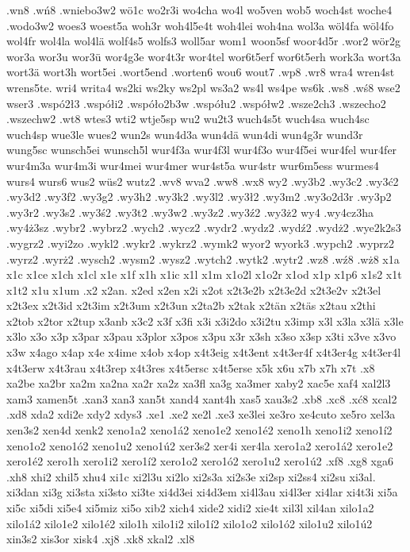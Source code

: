 {{.wn8
.wń8
.wniebo3w2
wö1c
wo2r3i
wo4cha
wo4l
wo5ven
wob5
woch4st
woche4
.wodo3w2
woes3
woest5a
woh3r
woh4l5e4t
woh4lei
woh4na
wol3a
wöl4fa
wöl4fo
wol4fr
wol4la
wol4lä
wolf4s5
wolfs3
woll5ar
wom1
woon5sf
woor4d5r
.wor2
wör2g
wor3a
wor3u
wor3ü
wor4g3e
wor4t3r
wor4tel
wor6t5erf
wor6t5erh
work3a
wort3a
wort3ä
wort3h
wort5ei
.wort5end
.worten6
wou6
wout7
.wp8
.wr8
wra4
wren4st
wrens5te.
wri4
writa4
ws2ki
ws2ky
ws2pl
ws3a2
ws4l
ws4pe
ws6k
.ws8
.wś8
wse2
wser3
.wspó2ł3
.współi2
.współo2b3w
.współu2
.współw2
.wsze2ch3
.wszecho2
.wszechw2
.wt8
wtes3
wti2
wtje5sp
wu2
wu2t3
wuch4s5t
wuch4sa
wuch4sc
wuch4sp
wue3le
wues2
wun2s
wun4d3a
wun4dä
wun4di
wun4g3r
wund3r
wung5sc
wunsch5ei
wunsch5l
wur4f3a
wur4f3l
wur4f3o
wur4f5ei
wur4fel
wur4fer
wur4m3a
wur4m3i
wur4mei
wur4mer
wur4st5a
wur4str
wur6m5ess
wurmes4
wurs4
wurs6
wus2
wüs2
wutz2
.wv8
wva2
.ww8
.wx8
wy2
.wy3b2
.wy3c2
.wy3ć2
.wy3d2
.wy3f2
.wy3g2
.wy3h2
.wy3k2
.wy3l2
.wy3ł2
.wy3m2
.wy3o2d3r
.wy3p2
.wy3r2
.wy3s2
.wy3ś2
.wy3t2
.wy3w2
.wy3z2
.wy3ź2
.wy3ż2
wy4
.wy4cz3ha
.wy4ż3sz
.wybr2
.wybrz2
.wych2
.wycz2
.wydr2
.wydz2
.wydź2
.wydż2
.wye2k2s3
.wygrz2
.wyi2zo
.wykl2
.wykr2
.wykrz2
.wymk2
wyor2
wyork3
.wypch2
.wyprz2
.wyrz2
.wyrż2
.wysch2
.wysm2
.wysz2
.wytch2
.wytk2
.wytr2
.wz8
.wź8
.wż8
x1a
x1c
x1ce
x1ch
x1cl
x1e
x1f
x1h
x1ic
x1l
x1m
x1o2l
x1o2r
x1od
x1p
x1p6
x1s2
x1t
x1t2
x1u
x1um
.x2
x2an.
x2ed
x2en
x2i
x2ot
x2t3e2b
x2t3e2d
x2t3e2v
x2t3el
x2t3ex
x2t3id
x2t3im
x2t3um
x2t3un
x2ta2b
x2tak
x2tän
x2täs
x2tau
x2thi
x2tob
x2tor
x2tup
x3anb
x3c2
x3f
x3fi
x3i
x3i2do
x3i2tu
x3imp
x3l
x3la
x3lä
x3le
x3lo
x3o
x3p
x3par
x3pau
x3plor
x3pos
x3pu
x3r
x3sh
x3so
x3sp
x3ti
x3ve
x3vo
x3w
x4ago
x4ap
x4e
x4ime
x4ob
x4op
x4t3eig
x4t3ent
x4t3er4f
x4t3er4g
x4t3er4l
x4t3erw
x4t3rau
x4t3rep
x4t3res
x4t5ersc
x4t5erse
x5k
x6u
x7b
x7h
x7t
.x8
xa2be
xa2br
xa2m
xa2na
xa2r
xa2z
xa3fl
xa3g
xa3mer
xaby2
xac5e
xaf4
xal2l3
xam3
xamen5t
.xan3
xan3
xan5t
xand4
xant4h
xas5
xau3s2
.xb8
.xc8
.xć8
xcal2
.xd8
xda2
xdi2e
xdy2
xdys3
.xe1
.xe2
xe2l
.xe3
xe3lei
xe3ro
xe4cuto
xe5ro
xel3a
xen3s2
xen4d
xenk2
xeno1a2
xeno1á2
xeno1e2
xeno1é2
xeno1h
xeno1i2
xeno1í2
xeno1o2
xeno1ó2
xeno1u2
xeno1ú2
xer3s2
xer4i
xer4la
xero1a2
xero1á2
xero1e2
xero1é2
xero1h
xero1i2
xero1í2
xero1o2
xero1ó2
xero1u2
xero1ú2
.xf8
.xg8
xga6
.xh8
xhi2
xhil5
xhu4
xi1c
xi2l3u
xi2lo
xi2s3a
xi2s3e
xi2sp
xi2ss4
xi2su
xi3al.
xi3dan
xi3g
xi3sta
xi3sto
xi3te
xi4d3ei
xi4d3em
xi4l3au
xi4l3er
xi4lar
xi4t3i
xi5a
xi5c
xi5di
xi5e4
xi5miz
xi5o
xib2
xich4
xide2
xidi2
xie4t
xil3l
xil4an
xilo1a2
xilo1á2
xilo1e2
xilo1é2
xilo1h
xilo1i2
xilo1í2
xilo1o2
xilo1ó2
xilo1u2
xilo1ú2
xin3s2
xis3or
xisk4
.xj8
.xk8
xkal2
.xl8
}}
